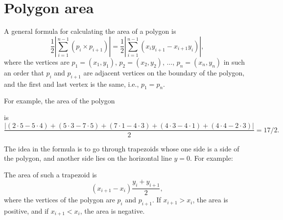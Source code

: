\section{Polygon area}

A general formula for calculating the area
of a polygon is
\[\frac{1}{2} |\sum_{i=1}^{n-1} (p_i \times p_{i+1})| =
\frac{1}{2} |\sum_{i=1}^{n-1} (x_i y_{i+1} - x_{i+1} y_i)|, \]
where the vertices are
$p_1=(x_1,y_1)$, $p_2=(x_2,y_2)$, $\ldots$, $p_n=(x_n,y_n)$
in such an order that
$p_i$ and $p_{i+1}$ are adjacent vertices on the boundary
of the polygon,
and the first and last vertex is the same, i.e., $p_1=p_n$.

For example, the area of the polygon
\begin{center}
\end{center}
is
\[\frac{|(2\cdot5-5\cdot4)+(5\cdot3-7\cdot5)+(7\cdot1-4\cdot3)+(4\cdot3-4\cdot1)+(4\cdot4-2\cdot3)|}{2} = 17/2.\]

The idea in the formula is to go through trapezoids
whose one side is a side of the polygon,
and another side lies on the horizontal line $y=0$.
For example:
\begin{center}
\end{center}
The area of such a trapezoid is
\[(x_{i+1}-x_{i}) \frac{y_i+y_{i+1}}{2},\]
where the vertices of the polygon are $p_i$ and $p_{i+1}$.
If $x_{i+1}>x_{i}$, the area is positive,
and if $x_{i+1}<x_{i}$, the area is negative.

